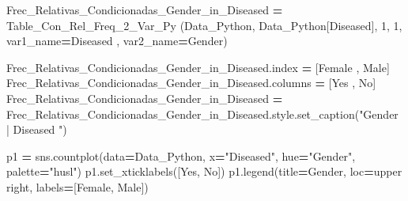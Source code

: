 \documentclass[
  11pt,
  a4paper,
]{article}
\newenvironment{Shaded}{\begin{snugshade}}{\end{snugshade}}
\newcommand{\DecValTok}[1]{\textcolor[rgb]{0.00,0.00,0.81}{#1}}
\newcommand{\NormalTok}[1]{#1}
\newcommand{\OperatorTok}[1]{\textcolor[rgb]{0.81,0.36,0.00}{\textbf{#1}}}
\newcommand{\StringTok}[1]{\textcolor[rgb]{0.31,0.60,0.02}{#1}}
\begin{document}
\begin{Shaded}
\begin{Highlighting}[]
\NormalTok{Frec\_Relativas\_Condicionadas\_Gender\_in\_Diseased }\OperatorTok{=}\NormalTok{ Table\_Con\_Rel\_Freq\_2\_Var\_Py (Data\_Python, Data\_Python[}\StringTok{\textquotesingle{}Diseased\textquotesingle{}}\NormalTok{], }\DecValTok{1}\NormalTok{, }\DecValTok{1}\NormalTok{, var1\_name}\OperatorTok{=}\StringTok{\textquotesingle{}Diseased\textquotesingle{}}\NormalTok{ , var2\_name}\OperatorTok{=}\StringTok{\textquotesingle{}Gender\textquotesingle{}}\NormalTok{)}

\NormalTok{Frec\_Relativas\_Condicionadas\_Gender\_in\_Diseased.index }\OperatorTok{=}\NormalTok{ [}\StringTok{\textquotesingle{}Female\textquotesingle{}}\NormalTok{ , }\StringTok{\textquotesingle{}Male\textquotesingle{}}\NormalTok{]}
\NormalTok{Frec\_Relativas\_Condicionadas\_Gender\_in\_Diseased.columns }\OperatorTok{=}\NormalTok{ [}\StringTok{\textquotesingle{}Yes\textquotesingle{}}\NormalTok{ , }\StringTok{\textquotesingle{}No\textquotesingle{}}\NormalTok{]}
\NormalTok{Frec\_Relativas\_Condicionadas\_Gender\_in\_Diseased }\OperatorTok{=}\NormalTok{ Frec\_Relativas\_Condicionadas\_Gender\_in\_Diseased.style.set\_caption(}\StringTok{"Gender  |  Diseased "}\NormalTok{)}
\end{Highlighting}
\end{Shaded}

\begin{Shaded}
\begin{Highlighting}[]
\NormalTok{p1 }\OperatorTok{=}\NormalTok{ sns.countplot(data}\OperatorTok{=}\NormalTok{Data\_Python, x}\OperatorTok{=}\StringTok{"Diseased"}\NormalTok{, hue}\OperatorTok{=}\StringTok{"Gender"}\NormalTok{, palette}\OperatorTok{=}\StringTok{"husl"}\NormalTok{)}
\NormalTok{p1.set\_xticklabels([}\StringTok{\textquotesingle{}Yes\textquotesingle{}}\NormalTok{, }\StringTok{\textquotesingle{}No\textquotesingle{}}\NormalTok{])}
\NormalTok{p1.legend(title}\OperatorTok{=}\StringTok{\textquotesingle{}Gender\textquotesingle{}}\NormalTok{, loc}\OperatorTok{=}\StringTok{\textquotesingle{}upper right\textquotesingle{}}\NormalTok{, labels}\OperatorTok{=}\NormalTok{[}\StringTok{\textquotesingle{}Female\textquotesingle{}}\NormalTok{, }\StringTok{\textquotesingle{}Male\textquotesingle{}}\NormalTok{])}
\end{Highlighting}
\end{Shaded}
\end{document}
